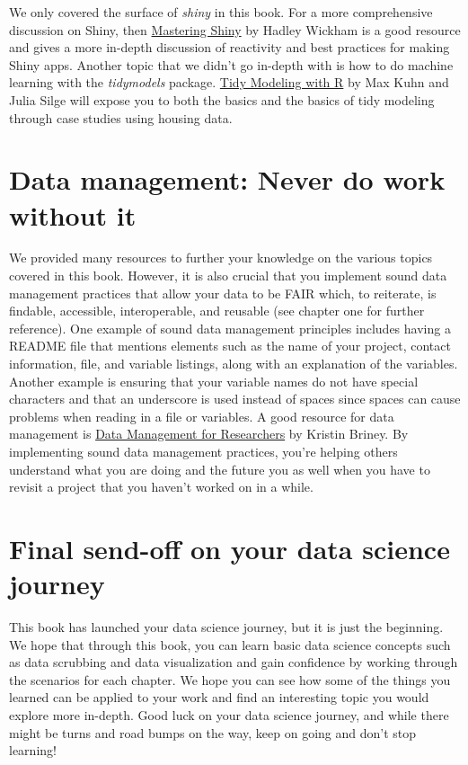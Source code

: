 \documentclass[
  krantz2]{krantz}
\begin{document}
We only covered the surface of \emph{shiny} in this book. For a more comprehensive discussion on Shiny, then \href{https://mastering-shiny.org/}{Mastering Shiny} by Hadley Wickham is a good resource and gives a more in-depth discussion of reactivity and best practices for making Shiny apps. Another topic that we didn't go in-depth with is how to do machine learning with the \emph{tidymodels} package. \href{https://www.tmwr.org/}{Tidy Modeling with R} by Max Kuhn and Julia Silge will expose you to both the basics and the basics of tidy modeling through case studies using housing data.

\hypertarget{data-management-never-do-work-without-it}{%
\section{Data management: Never do work without it}\label{data-management-never-do-work-without-it}}

We provided many resources to further your knowledge on the various topics covered in this book. However, it is also crucial that you implement sound data management practices that allow your data to be FAIR which, to reiterate, is findable, accessible, interoperable, and reusable (see chapter one for further reference). One example of sound data management principles includes having a README file that mentions elements such as the name of your project, contact information, file, and variable listings, along with an explanation of the variables. Another example is ensuring that your variable names do not have special characters and that an underscore is used instead of spaces since spaces can cause problems when reading in a file or variables. A good resource for data management is \href{https://pelagicpublishing.com/products/data-management-for-researchers-briney\#}{Data Management for Researchers} by Kristin Briney. By implementing sound data management practices, you're helping others understand what you are doing and the future you as well when you have to revisit a project that you haven't worked on in a while.

\hypertarget{final-send-off-on-your-data-science-journey}{%
\section{Final send-off on your data science journey}\label{final-send-off-on-your-data-science-journey}}

This book has launched your data science journey, but it is just the beginning. We hope that through this book, you can learn basic data science concepts such as data scrubbing and data visualization and gain confidence by working through the scenarios for each chapter. We hope you can see how some of the things you learned can be applied to your work and find an interesting topic you would explore more in-depth. Good luck on your data science journey, and while there might be turns and road bumps on the way, keep on going and don't stop learning!
\end{document}
